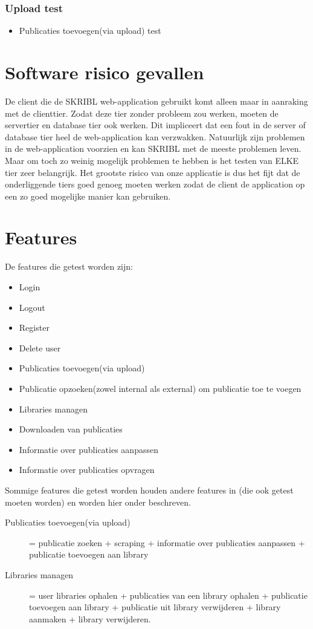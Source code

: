 \documentclass{article}
\begin{document}
\subsubsection{Upload test}
\begin{itemize}
  \item Publicaties toevoegen(via upload) test
\end{itemize}
\section{Software risico gevallen}
De client die de SKRIBL web-application gebruikt komt alleen maar in aanraking met de clienttier. Zodat deze tier zonder probleem zou werken, moeten de servertier en database tier ook werken. Dit impliceert dat een fout in de server of database tier heel de web-application kan verzwakken. Natuurlijk zijn problemen in de web-application voorzien en kan SKRIBL met de meeste problemen leven. Maar om toch zo weinig mogelijk problemen te hebben is het testen  van ELKE tier zeer belangrijk. Het grootste risico van onze applicatie is dus het fijt dat de onderliggende tiers goed genoeg moeten werken zodat de client de application op een  zo goed mogelijke manier kan gebruiken.

\section{Features}
De features die getest worden zijn:
\begin{itemize}
  \item Login 
  \item Logout 
  \item Register
  \item Delete user
  \item Publicaties toevoegen(via upload)
  \item Publicatie opzoeken(zowel internal als external) om publicatie toe te voegen
  \item Libraries managen
  \item Downloaden van publicaties
  \item Informatie over publicaties aanpassen
  \item Informatie over publicaties opvragen
\end{itemize}
Sommige features die getest worden houden andere features in (die ook getest moeten worden) en worden hier onder beschreven.\\
\begin{description}
\item[Publicaties toevoegen(via upload)] = publicatie zoeken + scraping + informatie over publicaties aanpassen + publicatie toevoegen aan library
\item[Libraries managen] = user libraries ophalen + publicaties van een library ophalen + publicatie toevoegen aan library + publicatie uit library verwijderen + library aanmaken + library verwijderen.
\end{description}
\end{document}

